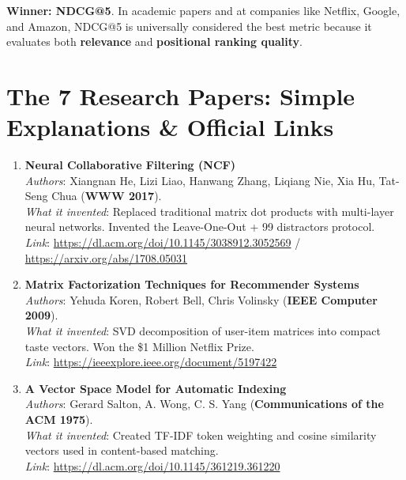 \documentclass[11pt,a4paper]{article}
\begin{document}
\begin{tcolorbox}[title=Which Single Metric is the Absolute Best?]
\textbf{Winner: NDCG@5}. In academic papers and at companies like Netflix, Google, and Amazon, NDCG@5 is universally considered the best metric because it evaluates both \textbf{relevance} and \textbf{positional ranking quality}.
\end{tcolorbox}

\section{The 7 Research Papers: Simple Explanations \& Official Links}

\begin{enumerate}
    \item \textbf{Neural Collaborative Filtering (NCF)}\\
    \textit{Authors}: Xiangnan He, Lizi Liao, Hanwang Zhang, Liqiang Nie, Xia Hu, Tat-Seng Chua (\textbf{WWW 2017}).\\
    \textit{What it invented}: Replaced traditional matrix dot products with multi-layer neural networks. Invented the Leave-One-Out + 99 distractors protocol.\\
    \textit{Link}: \url{https://dl.acm.org/doi/10.1145/3038912.3052569} / \url{https://arxiv.org/abs/1708.05031}

    \item \textbf{Matrix Factorization Techniques for Recommender Systems}\\
    \textit{Authors}: Yehuda Koren, Robert Bell, Chris Volinsky (\textbf{IEEE Computer 2009}).\\
    \textit{What it invented}: SVD decomposition of user-item matrices into compact taste vectors. Won the \$1 Million Netflix Prize.\\
    \textit{Link}: \url{https://ieeexplore.ieee.org/document/5197422}

    \item \textbf{A Vector Space Model for Automatic Indexing}\\
    \textit{Authors}: Gerard Salton, A. Wong, C. S. Yang (\textbf{Communications of the ACM 1975}).\\
    \textit{What it invented}: Created TF-IDF token weighting and cosine similarity vectors used in content-based matching.\\
    \textit{Link}: \url{https://dl.acm.org/doi/10.1145/361219.361220}


\end{enumerate}
\end{document}

